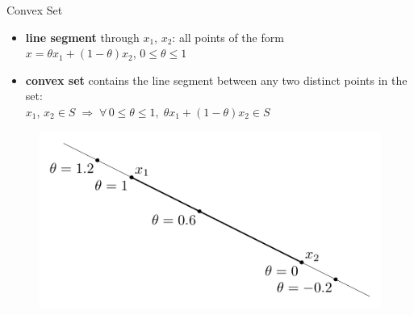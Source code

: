 \documentclass[10pt]{beamer}
\newcommand{\ds}{\displaystyle}
\newcommand{\ie}{\;\Longrightarrow\;}
\theoremstyle{definition}
\begin{document}
\begin{frame}{Convex Set}
\begin{itemize}
  \item {\bf line segment} through $x_1$, $x_2$: all points of the form \\$\ds x = \theta x_1 + (1 - \theta) x_2$, $0\leqslant\theta\leqslant 1$
  \item {\bf convex set} contains the line segment between any two distinct points in the set: \\$\ds x_1,\,x_2\in S\ie \forall\,0\leqslant\theta\leqslant 1,\;\theta x_1 + (1 - \theta) x_2\in S$
\end{itemize}

\begin{figure}[!htbp]
  \centering
  \includegraphics[scale=1,page=2]{fig/note06/02.pdf}
\end{figure}

\end{frame}
\end{document}
